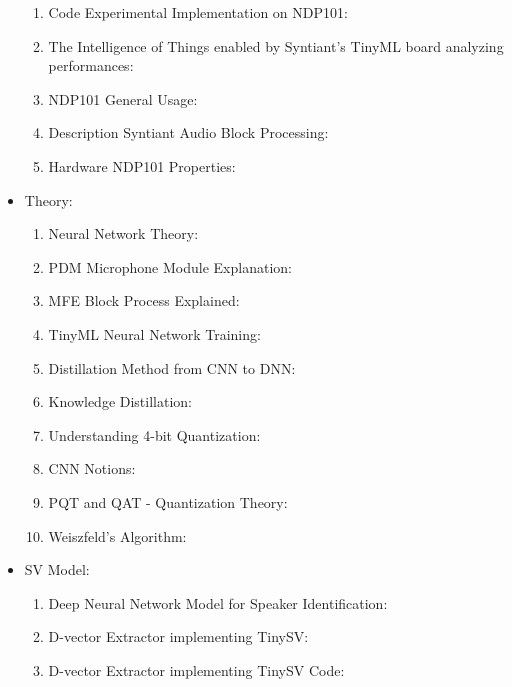 \begin{itemize}
\begin{enumerate}
    \item Code Experimental Implementation on NDP101: \cite{origin_code_1}
    \item The Intelligence of Things enabled by Syntiant's TinyML board analyzing performances: \cite{analysis_syntiant_performances}
    \item NDP101 General Usage: \cite{description_ndp101}
    \item Description Syntiant Audio Block Processing: \cite{syntiant_audio_block}
    \item Hardware NDP101 Properties: \cite{hardware_ndp101}
\end{enumerate}
\item Theory:
\begin{enumerate}
    \item Neural Network Theory: \cite{neural_network_theory}
    \item PDM Microphone Module Explanation: \cite{PDM_module}
    \item MFE Block Process Explained: \cite{audio_processing_theory}
    \item TinyML Neural Network Training: \cite{neural_network_training}
    \item Distillation Method from CNN to DNN: \cite{distillation_from_cnn_to_dnn}
    \item Knowledge Distillation: \cite{knowledge_distillation}
    \item Understanding 4-bit Quantization: \cite{wu2023understandingint4quantizationtransformer}
    \item CNN Notions: \cite{introduction_CNN}
    \item PQT and QAT - Quantization Theory: \cite{ptq_and_qat_indepth_quantization}
    \item Weiszfeld's Algorithm: \cite{weiszfeldsalgorithm}
\end{enumerate}
\item SV Model:
\begin{enumerate}
    \item Deep Neural Network Model for Speaker Identification: \cite{dnn_speaker_verification}
    \item D-vector Extractor implementing TinySV: \cite{dvector_extractor_TinySV}
    \item D-vector Extractor implementing TinySV Code: \cite{dvector_extractor_code}
\end{enumerate}
\end{itemize}
\newpage


